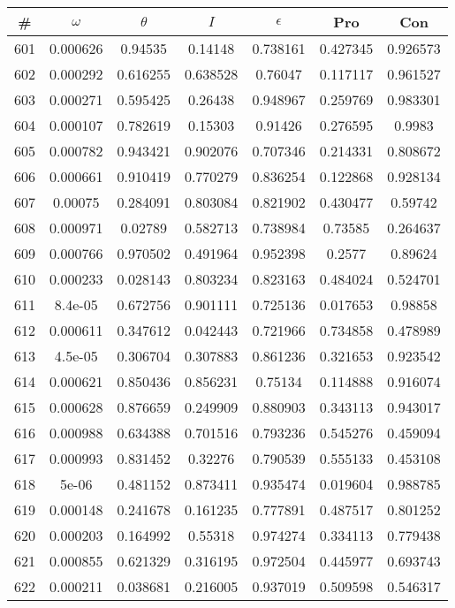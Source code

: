 \newpage
\begin{table}
\begin{tabular}{c|c|c|c|c|c|c}
\# & $\omega$ & $\theta$ & $I$ & $\epsilon$ & Pro & Con\\
\hline
601 & 0.000626 & 0.94535 & 0.14148 & 0.738161 & 0.427345 & 0.926573\\
602 & 0.000292 & 0.616255 & 0.638528 & 0.76047 & 0.117117 & 0.961527\\
603 & 0.000271 & 0.595425 & 0.26438 & 0.948967 & 0.259769 & 0.983301\\
604 & 0.000107 & 0.782619 & 0.15303 & 0.91426 & 0.276595 & 0.9983\\
605 & 0.000782 & 0.943421 & 0.902076 & 0.707346 & 0.214331 & 0.808672\\
606 & 0.000661 & 0.910419 & 0.770279 & 0.836254 & 0.122868 & 0.928134\\
607 & 0.00075 & 0.284091 & 0.803084 & 0.821902 & 0.430477 & 0.59742\\
608 & 0.000971 & 0.02789 & 0.582713 & 0.738984 & 0.73585 & 0.264637\\
609 & 0.000766 & 0.970502 & 0.491964 & 0.952398 & 0.2577 & 0.89624\\
610 & 0.000233 & 0.028143 & 0.803234 & 0.823163 & 0.484024 & 0.524701\\
611 & 8.4e-05 & 0.672756 & 0.901111 & 0.725136 & 0.017653 & 0.98858\\
612 & 0.000611 & 0.347612 & 0.042443 & 0.721966 & 0.734858 & 0.478989\\
613 & 4.5e-05 & 0.306704 & 0.307883 & 0.861236 & 0.321653 & 0.923542\\
614 & 0.000621 & 0.850436 & 0.856231 & 0.75134 & 0.114888 & 0.916074\\
615 & 0.000628 & 0.876659 & 0.249909 & 0.880903 & 0.343113 & 0.943017\\
616 & 0.000988 & 0.634388 & 0.701516 & 0.793236 & 0.545276 & 0.459094\\
617 & 0.000993 & 0.831452 & 0.32276 & 0.790539 & 0.555133 & 0.453108\\
618 & 5e-06 & 0.481152 & 0.873411 & 0.935474 & 0.019604 & 0.988785\\
619 & 0.000148 & 0.241678 & 0.161235 & 0.777891 & 0.487517 & 0.801252\\
620 & 0.000203 & 0.164992 & 0.55318 & 0.974274 & 0.334113 & 0.779438\\
621 & 0.000855 & 0.621329 & 0.316195 & 0.972504 & 0.445977 & 0.693743\\
622 & 0.000211 & 0.038681 & 0.216005 & 0.937019 & 0.509598 & 0.546317\\

\end{tabular}
\end{table}
